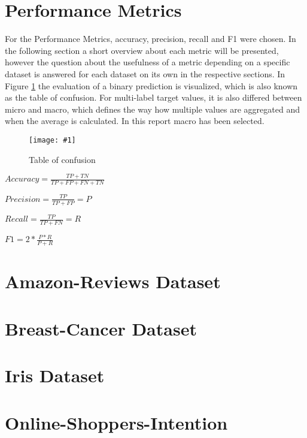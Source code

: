 \documentclass{article}
\newcommand{\size}{0.7\textwidth}
\newcommand{\image}[3]{
\begin{figure}
\begin{center}
\texttt{[image: \#1]}
\caption{#2}
#3
\end{center}
\end{figure}
}
\begin{document}
\section{Performance Metrics}
For the Performance Metrics, accuracy, precision, recall and F1 were chosen. In the following section a short overview about each metric will be presented, however the question about the usefulness of a metric depending on a specific dataset is answered for each dataset on its own in the respective sections. In Figure \ref{fig:conf} the evaluation of a binary prediction is visualized, which is also known as the table of confusion. For multi-label target values, it is also differed between micro and macro, which defines the way how multiple values are aggregated and when the average is calculated. In this report macro has been selected.

\image{performance.png}{Table of confusion}{\label{fig:conf}}
\begin{itemize}
\Large{
\item $Accuracy = \frac{TP + TN}{TP + FP + FN + TN}$

\item $Precision = \frac{TP}{TP+FP} = P$

\item $Recall = \frac{TP}{TP+FN} = R$

\item $F1=2*\frac{P*R}{P+R}$
}
\end{itemize}

\section{Amazon-Reviews Dataset}


\section{Breast-Cancer Dataset}


\section{Iris Dataset}


\section{Online-Shoppers-Intention}


\end{document}
